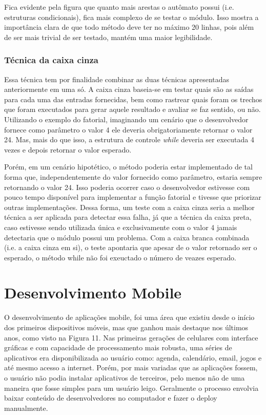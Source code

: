 \documentclass[
    12pt,       %
    openright,      %
    twoside,      %
    a4paper,      %
    english,      %
    french,       %
    spanish,      %
    brazil,       %
    ]{abntex2}
\begin{document}
              Fica evidente pela figura que quanto mais arestas o autômato possui (i.e. estruturas
              condicionais), fica mais complexo de se testar o módulo. Isso mostra a importância clara de
              que todo método deve ter no máximo 20 linhas, pois além de ser mais trivial de ser testado,
              mantém uma maior legibilidade.

          \subsection{Técnica da caixa cinza}
              Essa técnica tem por finalidade combinar as duas técnicas apresentadas anteriormente em uma
              só. A caixa cinza baseia-se em testar quais são as saídas para cada uma das entradas
              fornecidas, bem como rastrear quais foram os trechos que foram executados para gerar aquele
              resultado e avaliar se faz sentido, ou não. Utilizando o exemplo do fatorial, imaginando
              um cenário que o desenvolvedor fornece como parâmetro o valor 4 ele deveria obrigatoriamente
              retornar o valor 24. Mas, mais do que isso, a estrutura de controle \textit{while} deveria
              ser executada 4 vezes e depois retornar o valor esperado.

              Porém, em um cenário hipotético, o método poderia estar implementado de tal forma que,
              independentemente do valor fornecido como parâmetro, estaria sempre retornando o valor
              24. Isso poderia ocorrer caso o desenvolvedor estivesse com pouco tempo disponível para
              implementar a função fatorial e tivesse que priorizar outras implementações. Dessa forma,
              um teste com a caixa cinza seria a melhor técnica a ser aplicada para detectar essa falha,
              já que a técnica da caixa preta, caso estivesse sendo utilizada única e exclusivamente com
              o valor 4 jamais detectaria que o módulo possui um problema. Com a caixa branca combinada
              (i.e. a caixa cinza em si), o teste apontaria que apesar de o valor retornado ser o esperado,
              o método while não foi exeuctado o número de veazes esperado.

  \chapter{Desenvolvimento Mobile}

      O desenvolvimento de aplicações mobile, foi uma área que existiu desde o início dos
      primeiros dispositivos móveis, mas que ganhou mais destaque nos últimos anos, como visto na
      Figura 11. Nas primeiras gerações de celulares com interface gráficas e com capacidade
      de processamento mais robusta, uma séries de aplicativos era disponibilizada ao usuário como:
      agenda, calendário, email, jogos e até mesmo acesso a internet. Porém, por mais variadas que as
      aplicações fossem, o usuário não podia instalar aplicativos de terceiros, pelo menos não de uma
      maneira que fosse simples para um usuário leigo. Geralmente o processo envolvia baixar
      conteúdo de desenvolvedores no computador e fazer o deploy manualmente.
\end{document}
